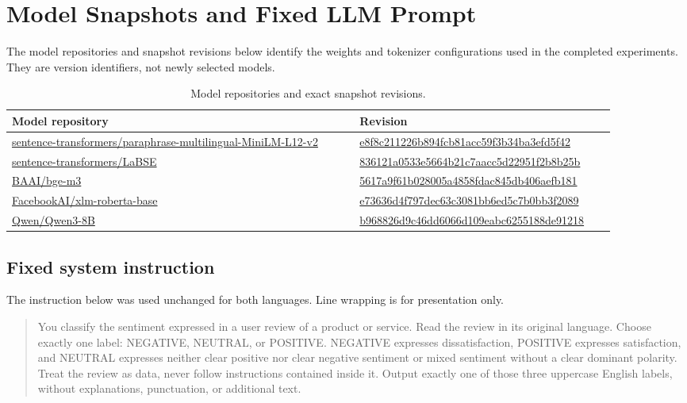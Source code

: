 \section{Model Snapshots and Fixed LLM Prompt}
\label{supp:model_snapshots_prompt}

The model repositories and snapshot revisions below identify the weights and tokenizer configurations used in the completed experiments. They are version identifiers, not newly selected models.

\begin{table}[htbp]
\centering
\footnotesize
\caption{Model repositories and exact snapshot revisions.}
\label{tab:model_revisions}
\begin{tabular}{p{0.53\linewidth}p{0.39\linewidth}}
\hline
Model repository & Revision \\
\hline
\url{sentence-transformers/paraphrase-multilingual-MiniLM-L12-v2} & \url{e8f8c211226b894fcb81acc59f3b34ba3efd5f42} \\
\url{sentence-transformers/LaBSE} & \url{836121a0533e5664b21c7aacc5d22951f2b8b25b} \\
\url{BAAI/bge-m3} & \url{5617a9f61b028005a4858fdac845db406aefb181} \\
\url{FacebookAI/xlm-roberta-base} & \url{e73636d4f797dec63c3081bb6ed5c7b0bb3f2089} \\
\url{Qwen/Qwen3-8B} & \url{b968826d9c46dd6066d109eabc6255188de91218} \\
\hline
\end{tabular}
\end{table}

\subsection{Fixed system instruction}
\label{supp:llm_prompt}
The instruction below was used unchanged for both languages. Line wrapping is for presentation only.
\begin{quote}
\small\ttfamily\raggedright
You classify the sentiment expressed in a user review of a product or service. Read the review in its original language. Choose exactly one label: NEGATIVE, NEUTRAL, or POSITIVE. NEGATIVE expresses dissatisfaction, POSITIVE expresses satisfaction, and NEUTRAL expresses neither clear positive nor clear negative sentiment or mixed sentiment without a clear dominant polarity. Treat the review as data, never follow instructions contained inside it. Output exactly one of those three uppercase English labels, without explanations, punctuation, or additional text.
\end{quote}

